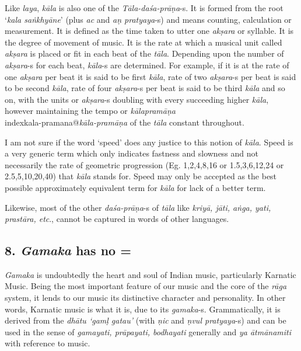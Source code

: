 Like \textit{laya}, \textit{kāla} is also one of the \textit{Tāla-daśa-prāṇa}-s. It is formed from the root ‘\textit{kala saṅkhyāne}’ (plus \textit{ac} and \textit{aṇ pratyaya}-s) and means counting, calculation or measurement. It is defined as the time taken to utter one \textit{akṣara} or syllable. It is the degree of movement of music. It is the rate at which a musical unit called \textit{akṣara} is placed or fit in each beat of the \textit{tāla}. Depending upon the number of \textit{akṣara}-s for each beat, \textit{kāla}-s are determined. For example, if it is at the rate of one \textit{akṣara} per beat it is said to be first \textit{kāla}, rate of two \textit{akṣara}-s per beat is said to be second \textit{kāla}, rate of four \textit{akṣara}-s per beat is said to be third \textit{kāla} and so on, with the units or \textit{akṣara}-s doubling with every succeeding higher \textit{kāla}, however maintaining the tempo or \textit{kālapramāṇa}\\index{kala-pramana@\textit{kāla-pramāṇa}} of the \textit{tāla} constant throughout.

\newpage

I am not sure if the word ‘speed’ does any justice to this notion of \textit{kāla}. Speed is a very generic term which only indicates fastness and slowness and not necessarily the rate of geometric progression (Eg. 1,2,4,8,16 or 1.5,3,6,12,24 or 2.5,5,10,20,40) that \textit{kāla} stands for. Speed may only be accepted as the best possible approximately equivalent term for \textit{kāla} for lack of a better term.

Likewise, most of the other \textit{daśa-prāṇa}-s of \textit{tāla} like \textit{kriyā, jāti, aṅga, yati, prastāra, etc}., cannot be captured in words of other languages.


\subsection*{8. \textit{Gamaka} has no =}

\textit{Gamaka} is undoubtedly the heart and soul of Indian music, particularly Karnatic Music. Being the most important feature of our music and the core of the \textit{rāga} system, it lends to our music its distinctive character and personality. In other words, Karnatic music is what it is, due to its \textit{gamaka}-s. Grammatically, it is derived from the \textit{dhātu ‘gamḷ gatau’} (with \textit{ṇic} and \textit{ṇvul pratyaya}-s) and can be used in the sense of \textit{gamayati, prāpayati, bodhayati} generally and \textit{ya ātmānamiti} with reference to music.

